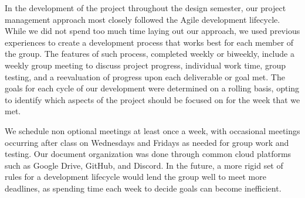 In the development of the project throughout the design semester, our project management approach most closely followed the Agile development lifecycle. 
While we did not spend too much time laying out our approach, we used previous experiences to create a development process that works best for each member of the group. 
The features of such process, completed weekly or biweekly, include a weekly group meeting to discuss project progress, individual work time, group testing, and a reevaluation of progress upon each deliverable or goal met. 
The goals for each cycle of our development were determined on a rolling basis, opting to identify which aspects of the project should be focused on for the week that we met. 

We schedule non optional meetings at least once a week, with occasional meetings occurring after class on Wednesdays and Fridays as needed for group work and testing. 
Our document organization was done through common cloud platforms such as Google Drive, GitHub, and Discord. 
In the future, a more rigid set of rules for a development lifecycle would lend the group well to meet more deadlines, as spending time each week to decide goals can become inefficient.